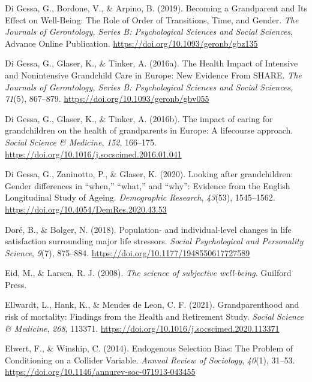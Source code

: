 \documentclass[
  english,
  man, noextraspace]{apa7}
\begin{document}
\leavevmode\hypertarget{ref-digessaBecomingGrandparentIts2019}{}%
Di Gessa, G., Bordone, V., \& Arpino, B. (2019). Becoming a Grandparent and Its Effect on Well-Being: The Role of Order of Transitions, Time, and Gender. \emph{The Journals of Gerontology, Series B: Psychological Sciences and Social Sciences}, Advance Online Publication. \url{https://doi.org/10.1093/geronb/gbz135}

\leavevmode\hypertarget{ref-digessaHealthImpactIntensive2016}{}%
Di Gessa, G., Glaser, K., \& Tinker, A. (2016a). The Health Impact of Intensive and Nonintensive Grandchild Care in Europe: New Evidence From SHARE. \emph{The Journals of Gerontology, Series B: Psychological Sciences and Social Sciences}, \emph{71}(5), 867--879. \url{https://doi.org/10.1093/geronb/gbv055}

\leavevmode\hypertarget{ref-digessaImpactCaringGrandchildren2016}{}%
Di Gessa, G., Glaser, K., \& Tinker, A. (2016b). The impact of caring for grandchildren on the health of grandparents in Europe: A lifecourse approach. \emph{Social Science \& Medicine}, \emph{152}, 166--175. \url{https://doi.org/10.1016/j.socscimed.2016.01.041}

\leavevmode\hypertarget{ref-digessaLookingGrandchildrenGender2020}{}%
Di Gessa, G., Zaninotto, P., \& Glaser, K. (2020). Looking after grandchildren: Gender differences in ``when,'' ``what,'' and ``why'': Evidence from the English Longitudinal Study of Ageing. \emph{Demographic Research}, \emph{43}(53), 1545--1562. \url{https://doi.org/10.4054/DemRes.2020.43.53}

\leavevmode\hypertarget{ref-dorePopulationIndividuallevelChanges2018}{}%
Doré, B., \& Bolger, N. (2018). Population- and individual-level changes in life satisfaction surrounding major life stressors. \emph{Social Psychological and Personality Science}, \emph{9}(7), 875--884. \url{https://doi.org/10.1177/1948550617727589}

\leavevmode\hypertarget{ref-eidScienceSubjectiveWellbeing2008}{}%
Eid, M., \& Larsen, R. J. (2008). \emph{The science of subjective well-being}. Guilford Press.

\leavevmode\hypertarget{ref-ellwardtGrandparenthoodRiskMortality2021}{}%
Ellwardt, L., Hank, K., \& Mendes de Leon, C. F. (2021). Grandparenthood and risk of mortality: Findings from the Health and Retirement Study. \emph{Social Science \& Medicine}, \emph{268}, 113371. \url{https://doi.org/10.1016/j.socscimed.2020.113371}

\leavevmode\hypertarget{ref-elwertEndogenousSelectionBias2014}{}%
Elwert, F., \& Winship, C. (2014). Endogenous Selection Bias: The Problem of Conditioning on a Collider Variable. \emph{Annual Review of Sociology}, \emph{40}(1), 31--53. \url{https://doi.org/10.1146/annurev-soc-071913-043455}
\end{document}
